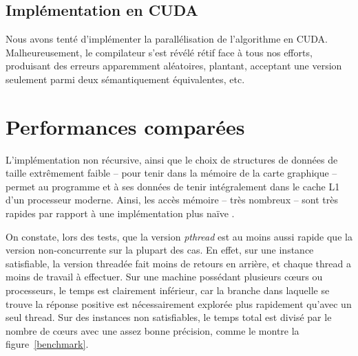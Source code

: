 \documentclass{article}
\newcommand{\cuda}{\textsc{CUDA}}
\begin{document}
\subsection{Implémentation en \cuda}
    Nous avons tenté d'implémenter la parallélisation de l'algorithme en \cuda. Malheureusement, le compilateur s'est révélé rétif face à tous nos efforts, produisant des erreurs apparemment aléatoires, plantant, acceptant une version seulement parmi deux sémantiquement équivalentes, etc.



\section{Performances comparées}
    L'implémentation non récursive, ainsi que le choix de structures de données de taille extrêmement faible -- pour tenir dans la mémoire de la carte graphique -- permet au programme et à ses données de tenir intégralement dans le cache L1 d'un processeur moderne. Ainsi, les accès mémoire -- très nombreux -- sont très rapides par rapport à une implémentation plus \og naïve \fg.

    On constate, lors des tests, que la version \emph{pthread} est au moins aussi rapide que la version non-concurrente sur la plupart des cas. En effet, sur une instance satisfiable, la version threadée fait moins de retours en arrière, et chaque thread a moins de travail à effectuer. Sur une machine possédant plusieurs cœurs ou processeurs, le temps est clairement inférieur, car la branche dans laquelle se trouve la réponse positive est nécessairement explorée plus rapidement qu'avec un seul thread. Sur des instances non satisfiables, le temps total est divisé par le nombre de cœurs avec une assez bonne précision, comme le montre la figure~\ref{benchmark}.

\end{document}
